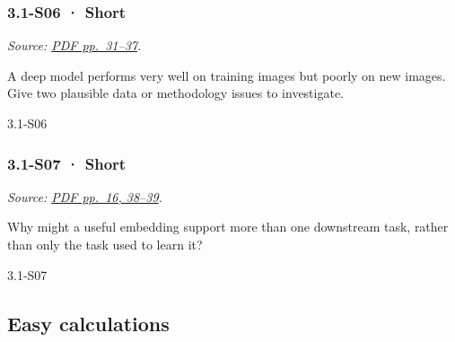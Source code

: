 \noindent\begin{minipage}{\linewidth}

\subsubsection{3.1-S06 · Short}\label{s06-short-7}

\emph{Source:
\href{../Lecture\%20Slides/3.1.\%20Introduction\%20to\%20Deep\%20Learning.pdf\#page=31}{PDF
pp.~31--37}.}

A deep model performs very well on training images but poorly on new
images. Give two plausible data or methodology issues to investigate.

\begin{solution}[20mm]{3.1-S06}

\end{solution}
\end{minipage}\par\medskip

\noindent\begin{minipage}{\linewidth}

\subsubsection{3.1-S07 · Short}\label{s07-short-7}

\emph{Source:
\href{../Lecture\%20Slides/3.1.\%20Introduction\%20to\%20Deep\%20Learning.pdf\#page=16}{PDF
pp.~16, 38--39}.}

Why might a useful embedding support more than one downstream task,
rather than only the task used to learn it?

\begin{solution}[20mm]{3.1-S07}

\end{solution}
\end{minipage}\par\medskip

\subsection{Easy calculations}\label{easy-calculations-7}

